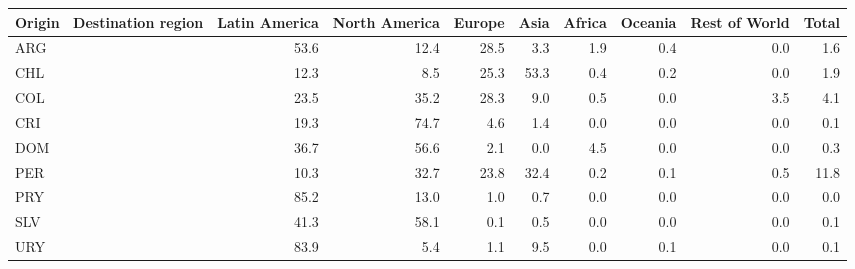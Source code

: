 \begin{tabular}{lrrrrrrrr}
\toprule
Origin \ Destination region & Latin America & North America & Europe & Asia & Africa & Oceania & Rest of World & Total \\
\midrule
ARG & 53.6 & 12.4 & 28.5 & 3.3 & 1.9 & 0.4 & 0.0 & 1.6 \\
CHL & 12.3 & 8.5 & 25.3 & 53.3 & 0.4 & 0.2 & 0.0 & 1.9 \\
COL & 23.5 & 35.2 & 28.3 & 9.0 & 0.5 & 0.0 & 3.5 & 4.1 \\
CRI & 19.3 & 74.7 & 4.6 & 1.4 & 0.0 & 0.0 & 0.0 & 0.1 \\
DOM & 36.7 & 56.6 & 2.1 & 0.0 & 4.5 & 0.0 & 0.0 & 0.3 \\
PER & 10.3 & 32.7 & 23.8 & 32.4 & 0.2 & 0.1 & 0.5 & 11.8 \\
PRY & 85.2 & 13.0 & 1.0 & 0.7 & 0.0 & 0.0 & 0.0 & 0.0 \\
SLV & 41.3 & 58.1 & 0.1 & 0.5 & 0.0 & 0.0 & 0.0 & 0.1 \\
URY & 83.9 & 5.4 & 1.1 & 9.5 & 0.0 & 0.1 & 0.0 & 0.1 \\
\bottomrule
\end{tabular}
